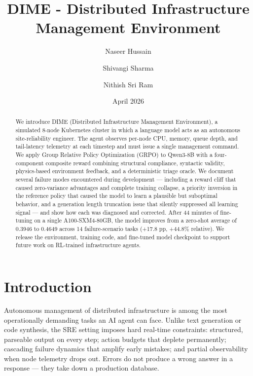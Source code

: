 \documentclass{article}
\title{DIME - Distributed Infrastructure Management Environment}
\author{Naseer Hussain \and Shivangi Sharma \and Nithish Sri Ram}
\date{April 2026}
\begin{document}
\maketitle

\begin{abstract}
We introduce DIME (Distributed Infrastructure Management Environment), a simulated
8-node Kubernetes cluster in which a language model acts as an autonomous
site-reliability engineer. The agent observes per-node CPU, memory, queue depth, and
tail-latency telemetry at each timestep and must issue a single management command.
We apply Group Relative Policy Optimization (GRPO) to Qwen3-8B with a four-component
composite reward combining structural compliance, syntactic validity, physics-based
environment feedback, and a deterministic triage oracle. We document several failure
modes encountered during development --- including a reward cliff that caused
zero-variance advantages and complete training collapse, a priority inversion in the
reference policy that caused the model to learn a plausible but suboptimal behavior,
and a generation length truncation issue that silently suppressed all learning signal ---
and show how each was diagnosed and corrected. After 44 minutes of fine-tuning on a
single A100-SXM4-80GB, the model improves from a zero-shot average of 0.3946 to 0.4649
across 14 failure-scenario tasks (+17.8 pp, +44.8\% relative). We release the
environment, training code, and fine-tuned model checkpoint to support future work on
RL-trained infrastructure agents.
\end{abstract}

\section{Introduction}

Autonomous management of distributed infrastructure is among the most operationally
demanding tasks an AI agent can face. Unlike text generation or code synthesis, the
SRE setting imposes hard real-time constraints: structured, parseable output on every
step; action budgets that deplete permanently; cascading failure dynamics that amplify
early mistakes; and partial observability when node telemetry drops out. Errors do not
produce a wrong answer in a response --- they take down a production database.
\end{document}
